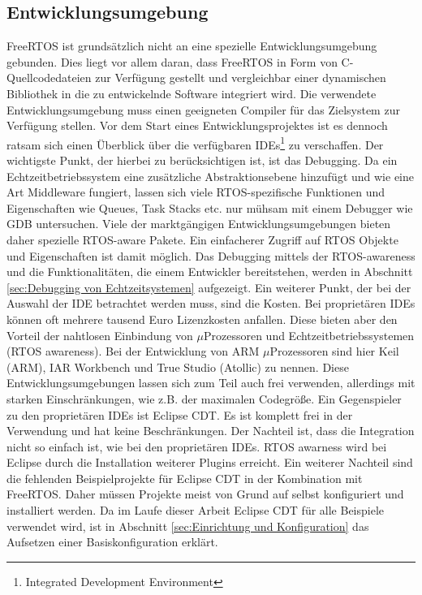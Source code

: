 \subsection{Entwicklungsumgebung}
\label{ref:Entwicklungsumgebung}
FreeRTOS ist grundsätzlich nicht an eine spezielle Entwicklungsumgebung gebunden. Dies liegt vor allem daran, dass FreeRTOS in Form von C-Quellcodedateien zur Verfügung gestellt und vergleichbar einer dynamischen Bibliothek in die zu entwickelnde Software integriert wird. Die verwendete Entwicklungsumgebung muss einen geeigneten Compiler für das Zielsystem zur Verfügung stellen. Vor dem Start eines Entwicklungsprojektes ist es dennoch ratsam sich einen Überblick über die ver\-fügbaren IDEs\footnote{Integrated Development Environment} zu verschaffen. Der wichtigste Punkt, der hierbei zu berücksichtigen ist, ist das Debugging. Da ein Echtzeitbetriebssystem eine zusätzliche Abstraktionsebene hinzufügt und wie eine Art Middleware fungiert, lassen sich viele RTOS-spezifische Funktionen und Eigenschaften wie Queues, Task Stacks etc. nur mühsam mit einem Debugger wie GDB untersuchen. Viele der markt\-gäng\-igen Entwicklungsumgebungen bieten daher spezielle RTOS-aware Pakete. Ein einfacherer Zugriff auf RTOS Objekte und Eigenschaften ist damit möglich. Das Debugging mittels der RTOS-awareness und die Funktionalitäten, die einem Entwickler bereitstehen, werden in Abschnitt \ref{sec:Debugging von Echtzeitsystemen} aufgezeigt. Ein weiterer Punkt, der bei der Auswahl der IDE betrachtet werden muss, sind die Kosten. Bei proprietären IDEs können oft mehrere tausend Euro Lizenzkosten anfallen. Diese bieten aber den Vorteil der nahtlosen Einbindung von $\mu$Prozessoren und Echtzeitbetriebssystemen (RTOS\- aware\-ness). Bei der Entwicklung von ARM $\mu$\-Prozessoren sind hier Keil (ARM), IAR Workbench und True Studio (Atollic) zu nennen. Diese Entwicklungsumgebungen lassen sich zum Teil auch frei verwenden, allerdings mit starken Einschränkungen, wie z.B. der maximalen Codegröße. Ein Gegenspieler zu den proprietären IDEs ist Eclipse CDT. Es ist komplett frei in der Verwendung und hat keine Beschränkungen. Der Nachteil ist, dass die Integration nicht so einfach ist, wie bei den proprietären IDEs. RTOS awar\-ness wird bei Eclipse durch die Installation weiterer Plugins erreicht. Ein weiterer Nachteil sind die fehlenden Beispielprojekte für Eclipse CDT in der Kombination mit FreeRTOS. Daher müssen Projekte meist von Grund auf selbst konfiguriert und installiert werden. Da im Laufe dieser Arbeit Eclipse CDT für alle Beispiele verwendet wird, ist in Abschnitt \ref{sec:Einrichtung und Konfiguration} das Aufsetzen einer Basiskonfiguration erklärt.